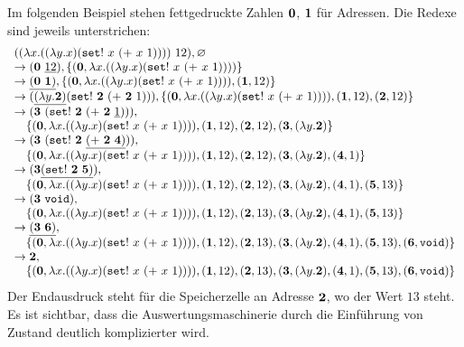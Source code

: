 Im folgenden Beispiel stehen fettgedruckte Zahlen ${\bf
0}$, ${\bf 1}$ für Adressen. Die Redexe sind jeweils
unterstrichen:
%
{\small
\begin{displaymath}
  \begin{array}{l}
    ((\lambda x.((\lambda y.x) (\mathtt{set!}~x~(+~x~1))))~12), \varnothing
    \\
    \rightarrow({\bf 0}~\underline{12}), \{ ({\bf 0}, \lambda x.((\lambda
    y.x) (\mathtt{set!}~x~(+~x~1)))) \}
    \\
    \rightarrow\underline{({\bf 0}~{\bf 1})}, \{ ({\bf 0}, \lambda x.((\lambda
    y.x) (\mathtt{set!}~x~(+~x~1)))), ({\bf 1}, 12) \}
    \\
    \rightarrow 
    (\underline{(\lambda y.{\bf 2})} (\mathtt{set!}~{\bf
    2}~(+~{\bf 2}~1))),
    \{ ({\bf 0}, \lambda x.((\lambda
    y.x) (\mathtt{set!}~x~(+~x~1)))), ({\bf 1}, 12), ({\bf
    2}, 12)\}\\
    \rightarrow 
    ({\bf 3}~(\mathtt{set!}~{\bf
    2}~(+~{\bf 2}~\underline{1}))),
    \\
    \quad
    \{ ({\bf 0}, \lambda x.((\lambda
    y.x) (\mathtt{set!}~x~(+~x~1)))), ({\bf 1}, 12), ({\bf
    2}, 12), ({\bf 3}, (\lambda y.{\bf 2}) \}
    \\
    \rightarrow 
    ({\bf 3}~(\mathtt{set!}~{\bf
    2}~\underline{(+~{\bf 2}~{\bf 4})})),
    \\
    \quad
    \{ ({\bf 0}, \lambda x.((\lambda
    y.x) (\mathtt{set!}~x~(+~x~1)))), ({\bf 1}, 12), ({\bf
    2}, 12), ({\bf 3}, (\lambda y.{\bf 2}),
    ({\bf 4}, 1) \}\\
    \rightarrow 
    ({\bf 3} \underline{(\mathtt{set!}~{\bf
      2}~{\bf 5})}),
    \\
    \quad
    \{ ({\bf 0}, \lambda x.((\lambda
    y.x) (\mathtt{set!}~x~(+~x~1)))), ({\bf 1}, 12), ({\bf
    2}, 12), ({\bf 3}, (\lambda y.{\bf 2}),
    ({\bf 4}, 1), ({\bf 5}, 13) \}
    \\
    \rightarrow 
    ({\bf 3}~\mathtt{void}),
    \\
    \quad
    \{ ({\bf 0}, \lambda x.((\lambda
    y.x) (\mathtt{set!}~x~(+~x~1)))), ({\bf 1}, 12), ({\bf
    2}, 13), ({\bf 3}, (\lambda y.{\bf 2}),
    ({\bf 4}, 1), ({\bf 5}, 13) \}
    \\
    \rightarrow 
    \underline{({\bf 3}~{\bf 6})},
    \\
    \quad
    \{ ({\bf 0}, \lambda x.((\lambda
    y.x) (\mathtt{set!}~x~(+~x~1)))), ({\bf 1}, 12), ({\bf
    2}, 13), ({\bf 3}, (\lambda y.{\bf 2}),
    ({\bf 4}, 1), ({\bf 5}, 13), ({\bf 6}, \mathtt{void}) \}
    \\
    \rightarrow 
    {\bf 2},
    \\
    \quad    \{ ({\bf 0}, \lambda x.((\lambda
    y.x) (\mathtt{set!}~x~(+~x~1)))), ({\bf 1}, 12), ({\bf
    2}, 13), ({\bf 3}, (\lambda y.{\bf 2}),
    ({\bf 4}, 1), ({\bf 5}, 13), ({\bf 6}, \mathtt{void}) \}
  \end{array}
\end{displaymath}
}
%
Der Endausdruck steht für die Speicherzelle an Adresse ${\bf
2}$, wo der Wert $13$ steht.  Es ist sichtbar, dass die
Auswertungsmaschinerie durch die Einführung von Zustand deutlich
komplizierter wird.

